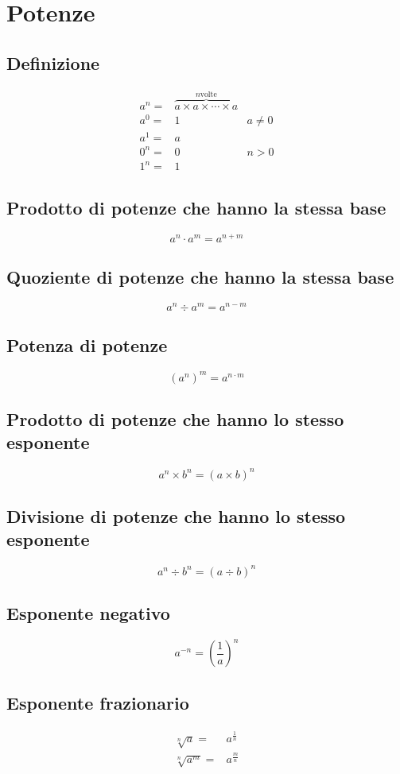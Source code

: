 \chapter{Potenze}
\section{Definizione}
\begin{align*}
a^n=&\overbrace{a\times a\times\cdots\times a}^{n{}\mbox{volte}}\\
a^0=&1&a\neq0\\
a^1=&a\\
0^n=&0&n>0\\
1^n=&1%
\end{align*}
\section{Prodotto di potenze che hanno la stessa base}
\begin{equation*}
a^n\cdot a^m=a^{n+m}
\end{equation*}
\section{Quoziente di potenze che hanno la stessa base}
\begin{equation*}
a^n\div a^m=a^{n-m}
\end{equation*}
\section{Potenza di potenze}
\begin{equation*}
(a^n)^m=a^{n\cdot m}
\end{equation*}
\section{Prodotto di potenze che hanno lo stesso esponente}
\begin{equation*}
a^n\times b^n=(a\times b)^n
\end{equation*}
\section{Divisione di potenze che hanno lo stesso esponente}
\begin{equation*}
a^n\div b^n=(a\div b )^n
\end{equation*}
\section{Esponente negativo}
\begin{equation*}
a^{-n}=\left(\dfrac{1}{a}\right)^n
\end{equation*}
\section{Esponente frazionario}
\begin{align*}
\sqrt[n]{a}=&a^{\frac{1}{n}}\\
\sqrt[n]{a^m}=&a^{\frac{m}{n}}
\end{align*}
